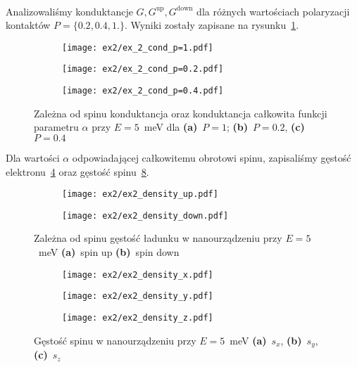 \documentclass{article}
\begin{document}
\\
Analizowaliśmy konduktancje $G, G^{\text{up}}, G^{\text{down}}$ dla różnych wartościach polaryzacji kontaktów $P=\{0.2, 0.4, 1.\}$.
Wyniki zostały zapisane na rysunku~\ref{fig:ex2-conduct-p}.
\begin{figure}[htp!]
    \centering
\begin{subfigure}{.32\textwidth}
    \texttt{[image: ex2/ex\_2\_cond\_p=1.pdf]}
    \caption{}
\end{subfigure}
\begin{subfigure}{.32\textwidth}
    \texttt{[image: ex2/ex\_2\_cond\_p=0.2.pdf]}
    \caption{}
\end{subfigure}
\begin{subfigure}{.32\textwidth}
    \texttt{[image: ex2/ex\_2\_cond\_p=0.4.pdf]}
    \caption{}
\end{subfigure}
    \caption{Zależna od spinu konduktancja oraz konduktancja całkowita funkcji parametru $\alpha$ przy $E = 5$~meV dla \textbf{(a)}~$P=1$; \textbf{(b)}~$P = 0.2$, \textbf{(c)}~$P = 0.4$}
    \label{fig:ex2-conduct-p}
\end{figure}
Dla wartości $\alpha$ odpowiadającej całkowitemu obrotowi spinu, zapisaliśmy gęstość elektronu~\ref{fig:spin-density-ex2} oraz gęstość spinu~\ref{fig:ex3-spin-density-s}.
\begin{figure}[htp!]
    \centering
\begin{subfigure}{.495\textwidth}
    \texttt{[image: ex2/ex2\_density\_up.pdf]}
    \caption{}
    \label{fig:ex2-spin-up}
\end{subfigure}
\begin{subfigure}{.495\textwidth}
    \texttt{[image: ex2/ex2\_density\_down.pdf]}
    \caption{}
    \label{fig:ex2-spin-down}
\end{subfigure}
\caption{Zależna od spinu gęstość ładunku w nanourządzeniu przy $E = 5$~meV \textbf{(a)}~spin up \textbf{(b)}~spin down}
\label{fig:spin-density-ex2}
\end{figure}
\begin{figure}[htp!]
    \centering
\begin{subfigure}{.32\textwidth}
    \texttt{[image: ex2/ex2\_density\_x.pdf]}
    \caption{}
    \label{fig:ex2-spin-sx}
\end{subfigure}
\begin{subfigure}{.32\textwidth}
    \texttt{[image: ex2/ex2\_density\_y.pdf]}
    \caption{}
    \label{fig:ex2-spin-sy}
\end{subfigure}
\begin{subfigure}{.32\textwidth}
    \texttt{[image: ex2/ex2\_density\_z.pdf]}
    \caption{}
    \label{fig:ex2-spin-sz}
\end{subfigure}
\caption{Gęstość spinu w nanourządzeniu przy $E = 5$~meV \textbf{(a)}~$s_x$, \textbf{(b)}~$s_y$, \textbf{(c)}~$s_z$}
\label{fig:ex3-spin-density-s}
\end{figure}
\end{document}
